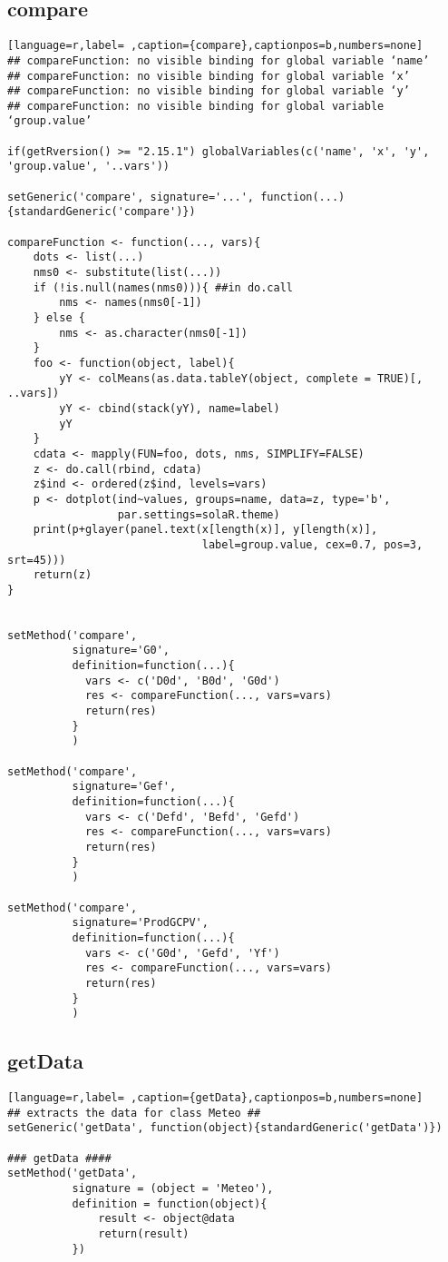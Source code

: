\subsection{compare}
\label{sec:orgf82b6ab}
\label{subsec:compare}
\begin{lstlisting}[language=r,label= ,caption={compare},captionpos=b,numbers=none]
## compareFunction: no visible binding for global variable ‘name’
## compareFunction: no visible binding for global variable ‘x’
## compareFunction: no visible binding for global variable ‘y’
## compareFunction: no visible binding for global variable ‘group.value’

if(getRversion() >= "2.15.1") globalVariables(c('name', 'x', 'y', 'group.value', '..vars'))

setGeneric('compare', signature='...', function(...){standardGeneric('compare')})

compareFunction <- function(..., vars){
    dots <- list(...)
    nms0 <- substitute(list(...))
    if (!is.null(names(nms0))){ ##in do.call
        nms <- names(nms0[-1])
    } else {
        nms <- as.character(nms0[-1])
    }
    foo <- function(object, label){
        yY <- colMeans(as.data.tableY(object, complete = TRUE)[, ..vars])
        yY <- cbind(stack(yY), name=label)
        yY
    }
    cdata <- mapply(FUN=foo, dots, nms, SIMPLIFY=FALSE)
    z <- do.call(rbind, cdata)
    z$ind <- ordered(z$ind, levels=vars)
    p <- dotplot(ind~values, groups=name, data=z, type='b',
                 par.settings=solaR.theme)
    print(p+glayer(panel.text(x[length(x)], y[length(x)],
                              label=group.value, cex=0.7, pos=3, srt=45)))
    return(z)
}


setMethod('compare',
          signature='G0',
          definition=function(...){
            vars <- c('D0d', 'B0d', 'G0d')
            res <- compareFunction(..., vars=vars)
            return(res)
          }
          )

setMethod('compare',
          signature='Gef',
          definition=function(...){
            vars <- c('Defd', 'Befd', 'Gefd')
            res <- compareFunction(..., vars=vars)
            return(res)
          }
          )

setMethod('compare',
          signature='ProdGCPV',
          definition=function(...){
            vars <- c('G0d', 'Gefd', 'Yf')
            res <- compareFunction(..., vars=vars)
            return(res)
          }
          )
\end{lstlisting}
\subsection{getData}
\label{sec:org4d52479}
\label{subsec:getData}
\begin{lstlisting}[language=r,label= ,caption={getData},captionpos=b,numbers=none]
## extracts the data for class Meteo ##
setGeneric('getData', function(object){standardGeneric('getData')})

### getData ####
setMethod('getData',
          signature = (object = 'Meteo'),
          definition = function(object){
              result <- object@data
              return(result)
          })
\end{lstlisting}
